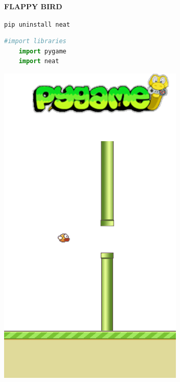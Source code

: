 \documentclass[10pt]{beamer}
\begin{document}
{\begin{frame}[fragile]{\textbf{FLAPPY BIRD}}
\begin{minipage}{0.65\textwidth}
\begin{itemize}
            \texttt{pip uninstall neat}
            \begin{lstlisting}[language=Python]
        #import libraries
    import pygame
    import neat
            \end{lstlisting}
        \end{itemize}
        \vspace{2cm}
    \end{minipage}
    \begin{minipage}{0.25\textwidth}
        \includegraphics[scale=0.38]{pipes_ground.png}
    \end{minipage}
\end{frame}
}
\end{document}

